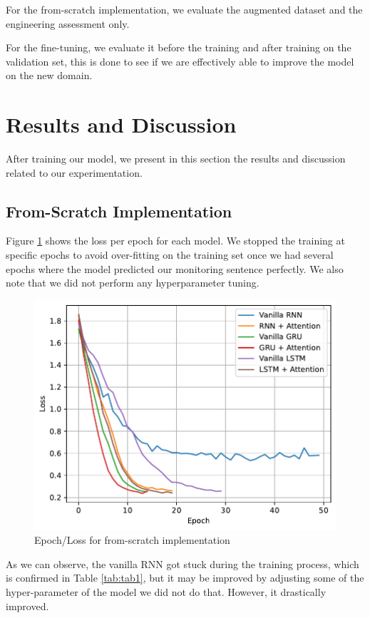 For the from-scratch implementation, we evaluate the augmented dataset and the engineering assessment only.

For the fine-tuning, we evaluate it before the training and after training on the validation set, this is done to see if we are effectively able to improve the model on the new domain.


\section{Results and Discussion}\label{res}
After training our model, we present in this section the results and discussion related to our experimentation.

\subsection{From-Scratch Implementation}
Figure \ref{fig:loss1} shows the loss per epoch for each model. We stopped the training at specific epochs to avoid over-fitting on the training set once we had several epochs where the model predicted our monitoring sentence perfectly. We also note that we did not perform any hyperparameter tuning.

\begin{figure}[H]
	\centering
	\includegraphics[width=0.9\linewidth]{./figures/vanilla.pdf}
	\caption{Epoch/Loss for from-scratch implementation}
	\label{fig:loss1}
\end{figure}

As we can observe, the vanilla RNN got stuck during the training process, which is confirmed in Table \ref{tab:tab1}, but it may be improved by adjusting some of the hyper-parameter of the model we did not do that. However, it drastically improved.

